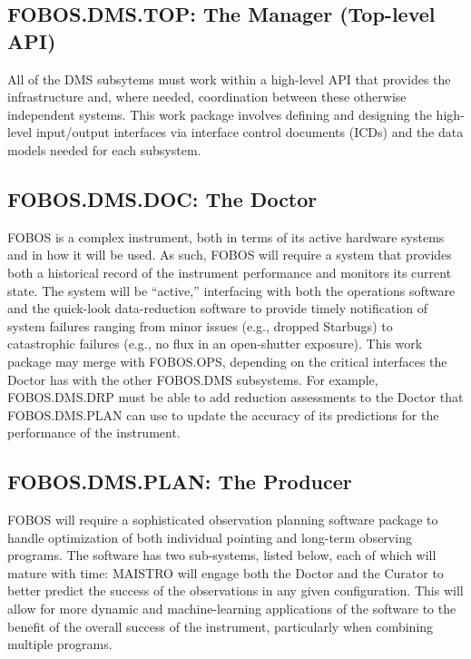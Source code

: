 \documentclass[oneside,11pt]{amsart}
\begin{document}
\subsection{FOBOS.DMS.TOP: The Manager (Top-level API)}

All of the DMS subsytems must work within a high-level API that
provides the infrastructure and, where needed, coordination between
these otherwise independent systems. This work package involves
defining and designing the high-level input/output interfaces via
interface control documents (ICDs) and the data models needed for
each subsystem.

\subsection{FOBOS.DMS.DOC: The Doctor}

FOBOS is a complex instrument, both in terms of its active hardware
systems and in how it will be used. As such, FOBOS will require a
system that provides both a historical record of the instrument
performance and monitors its current state. The system will be
“active,” interfacing with both the operations software and the
quick-look data-reduction software to provide timely notification of
system failures ranging from minor issues (e.g., dropped Starbugs) to
catastrophic failures (e.g., no flux in an open-shutter exposure).
This work package may merge with FOBOS.OPS, depending on the critical
interfaces the Doctor has with the other FOBOS.DMS subsystems. For
example, FOBOS.DMS.DRP must be able to add reduction assessments to
the Doctor that FOBOS.DMS.PLAN can use to update the accuracy of its
predictions for the performance of the instrument.

\subsection{FOBOS.DMS.PLAN: The Producer}

FOBOS will require a sophisticated observation planning software
package to handle optimization of both individual pointing and
long-term observing programs. The software has two sub-systems,
listed below, each of which will mature with time: MAISTRO will
engage both the Doctor and the Curator to better predict the success
of the observations in any given configuration. This will allow for
more dynamic and machine-learning applications of the software to the
benefit of the overall success of the instrument, particularly when
combining multiple programs.
\end{document}
